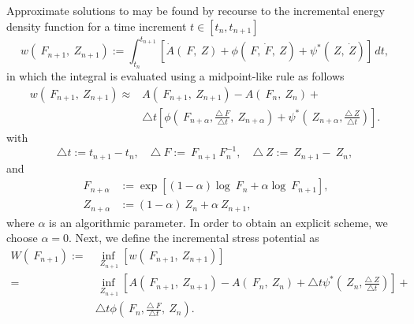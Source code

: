 \documentclass[12pt]{article}
\numberwithin{equation}{section}
\begin{document}
Approximate solutions to  may be found by
recourse to the incremental energy density function for a time
increment $t \in [t_n, t_{n+1}]$
\begin{equation} \label{incremental-energy-density}
  w(~F_{n+1}, ~Z_{n+1}) :=
  \int_{t_n}^{t_{n+1}}
  \left[
    \dot{A}(~F, ~Z)
    +
    \phi(~F, \dot{~F}, ~Z)
    +
    \psi^*(~Z, \dot{~Z})
  \right]
  \, dt,
\end{equation}
in which the integral is evaluated using a midpoint-like rule
as follows
\begin{equation} \label{incremental-energy-density-mid-point}
  \begin{split}
    w(~F_{n+1}, ~Z_{n+1}) \approx
    &
    A(~F_{n+1}, ~Z_{n+1}) - A(~F_n, ~Z_n) +
    \\
    &
    \triangle t
    \left[
      \phi
      \left(
        ~F_{n+\alpha}, \frac{\triangle ~F}{\triangle t}, ~Z_{n+\alpha}
      \right)
      +
      \psi^*
      \left(
        ~Z_{n+\alpha}, \frac{\triangle ~Z}{\triangle t}
      \right)
    \right].
  \end{split}
\end{equation}
with
\begin{equation} \label{eq:increments}
  \triangle t := t_{n+1} - t_n,
  \quad
  \triangle ~F := ~F_{n+1} ~F_n^{-1},
  \quad
  \triangle ~Z := ~Z_{n+1} - ~Z_n,
\end{equation}
and
\begin{equation} \label{eq:mid-values}
  \begin{split}
    ~F_{n+\alpha} & := \exp[(1 - \alpha) \log ~F_n + \alpha \log ~F_{n+1}],
    \\
    ~Z_{n+\alpha} & := (1 - \alpha) ~Z_n + \alpha ~Z_{n+1},
  \end{split}
\end{equation}
where $\alpha$ is an algorithmic parameter. In order to obtain an
explicit scheme, we choose $\alpha = 0$. Next, we define the
incremental stress potential as
\begin{equation} \label{eq:incremental-stress-potential}
  \begin{split}
    W(~F_{n+1})
    :=
    &
    \inf_{~Z_{n+1}}[w(~F_{n+1}, ~Z_{n+1})]
    \\
    =
    &
    \inf_{~Z_{n+1}}
    \left[
      A(~F_{n+1}, ~Z_{n+1}) - A(~F_n, ~Z_n)
      +
      \triangle t
      \psi^*\left(~Z_n, \frac{\triangle ~Z}{\triangle t}\right)
    \right]
    +
    \\
    &
    \triangle t
    \phi\left(~F_n, \frac{\triangle ~F}{\triangle t}, ~Z_n\right).
  \end{split}
\end{equation}
\end{document}
